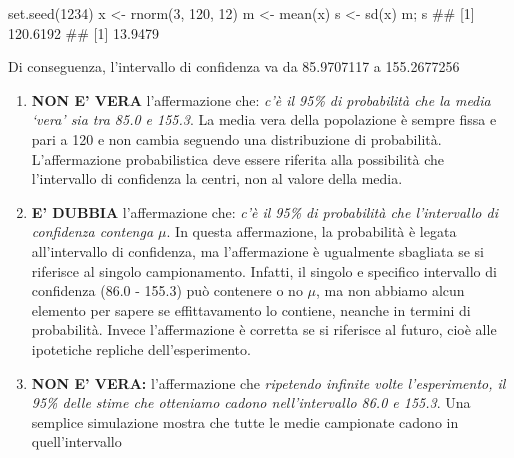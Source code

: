 \documentclass[a4paper,12pt,oneside]{book}
\providecommand{\tightlist}{%
  \setlength{\itemsep}{0pt}\setlength{\parskip}{0pt}}
\newenvironment{Shaded}{\begin{snugshade}}{\end{snugshade}}
\newcommand{\DecValTok}[1]{#1}
\newcommand{\DocumentationTok}[1]{#1}
\newcommand{\OtherTok}[1]{#1}
\newcommand{\FunctionTok}[1]{#1}
\newcommand{\NormalTok}[1]{#1}
\begin{document}
\begin{Shaded}
\begin{Highlighting}[]
\FunctionTok{set.seed}\NormalTok{(}\DecValTok{1234}\NormalTok{)}
\NormalTok{x }\OtherTok{\textless{}{-}} \FunctionTok{rnorm}\NormalTok{(}\DecValTok{3}\NormalTok{, }\DecValTok{120}\NormalTok{, }\DecValTok{12}\NormalTok{)}
\NormalTok{m }\OtherTok{\textless{}{-}} \FunctionTok{mean}\NormalTok{(x)}
\NormalTok{s }\OtherTok{\textless{}{-}} \FunctionTok{sd}\NormalTok{(x)}
\NormalTok{m; s}
\DocumentationTok{\#\# [1] 120.6192}
\DocumentationTok{\#\# [1] 13.9479}
\end{Highlighting}
\end{Shaded}

Di conseguenza, l'intervallo di confidenza va da 85.9707117 a 155.2677256

\begin{enumerate}
\def\labelenumi{\arabic{enumi}.}
\tightlist
\item
  \textbf{NON E' VERA} l'affermazione che: \emph{c'è il 95\% di probabilità che la media `vera' sia tra 85.0 e 155.3}. La media vera della popolazione è sempre fissa e pari a 120 e non cambia seguendo una distribuzione di probabilità. L'affermazione probabilistica deve essere riferita alla possibilità che l'intervallo di confidenza la centri, non al valore della media.
\item
  \textbf{E' DUBBIA} l'affermazione che: \emph{c'è il 95\% di probabilità che l'intervallo di confidenza contenga \(\mu\)}. In questa affermazione, la probabilità è legata all'intervallo di confidenza, ma l'affermazione è ugualmente sbagliata se si riferisce al singolo campionamento. Infatti, il singolo e specifico intervallo di confidenza (86.0 - 155.3) può contenere o no \(\mu\), ma non abbiamo alcun elemento per sapere se effittavamento lo contiene, neanche in termini di probabilità. Invece l'affermazione è corretta se si riferisce al futuro, cioè alle ipotetiche repliche dell'esperimento.
\item
  \textbf{NON E' VERA:} l'affermazione che \emph{ripetendo infinite volte l'esperimento, il 95\% delle stime che otteniamo cadono nell'intervallo 86.0 e 155.3}. Una semplice simulazione mostra che tutte le medie campionate cadono in quell'intervallo
\end{enumerate}
\end{document}
